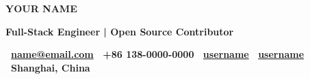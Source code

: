 \documentclass[10pt,a4paper]{article}
\begin{document}
\begin{center}
{\Huge\bfseries\color{heading} YOUR NAME}\par\medskip
{\large\bfseries\color{accent} Full-Stack Engineer | Open Source Contributor}\par\medskip
{\footnotesize\bfseries
\faAt~\href{mailto:name@email.com}{name@email.com}\hspace{2em}
\faPhone~+86 138-0000-0000\hspace{2em}
\faGithub~\href{https://github.com/username}{username}\hspace{2em}
\faLinkedin~\href{https://linkedin.com/in/username}{username}\hspace{2em}
\faMapMarker~Shanghai, China
}\par
\end{center}

\medskip
\end{document}
